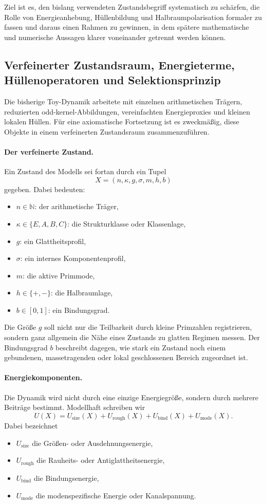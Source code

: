 \documentclass[11pt,a4paper]{article}
\theoremstyle{definition}
\begin{document}
Ziel ist es, den bislang verwendeten Zustandsbegriff systematisch zu schärfen, die Rolle von Energieanhebung, Hüllenbildung und Halbraumpolarisation formaler zu fassen und daraus einen Rahmen zu gewinnen, in dem spätere mathematische und numerische Aussagen klarer voneinander getrennt werden können.

\subsection{Verfeinerter Zustandsraum, Energieterme, Hüllenoperatoren und Selektionsprinzip}

Die bisherige Toy-Dynamik arbeitete mit einzelnen arithmetischen Trägern, reduzierten odd-kernel-Abbildungen, vereinfachten Energieproxies und kleinen lokalen Hüllen. Für eine axiomatische Fortsetzung ist es zweckmäßig, diese Objekte in einem verfeinerten Zustandsraum zusammenzuführen.

\paragraph{Der verfeinerte Zustand.}
Ein Zustand des Modells sei fortan durch ein Tupel
\[
X=(n,\kappa,g,\sigma,m,h,b)
\]
gegeben. Dabei bedeuten:
\begin{itemize}
	\item \(n\in\mathbb{N}\): der arithmetische Träger,
	\item \(\kappa\in\{E,A,B,C\}\): die Strukturklasse oder Klassenlage,
	\item \(g\): ein Glattheitsprofil,
	\item \(\sigma\): ein internes Komponentenprofil,
	\item \(m\): die aktive Primmode,
	\item \(h\in\{+,-\}\): die Halbraumlage,
	\item \(b\in[0,1]\): ein Bindungsgrad.
\end{itemize}

Die Größe \(g\) soll nicht nur die Teilbarkeit durch kleine Primzahlen registrieren, sondern ganz allgemein die Nähe eines Zustands zu glatten Regimen messen. Der Bindungsgrad \(b\) beschreibt dagegen, wie stark ein Zustand noch einem gebundenen, massetragenden oder lokal geschlossenen Bereich zugeordnet ist.

\paragraph{Energiekomponenten.}
Die Dynamik wird nicht durch eine einzige Energiegröße, sondern durch mehrere Beiträge bestimmt. Modellhaft schreiben wir
\[
U(X)=U_{\mathrm{size}}(X)+U_{\mathrm{rough}}(X)+U_{\mathrm{bind}}(X)+U_{\mathrm{mode}}(X).
\]
Dabei bezeichnet
\begin{itemize}
	\item \(U_{\mathrm{size}}\) die Größen- oder Ausdehnungsenergie,
	\item \(U_{\mathrm{rough}}\) die Rauheits- oder Antiglattheitsenergie,
	\item \(U_{\mathrm{bind}}\) die Bindungsenergie,
	\item \(U_{\mathrm{mode}}\) die modenspezifische Energie oder Kanalspannung.
\end{itemize}
\end{document}
